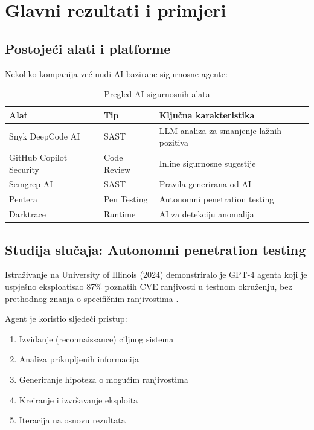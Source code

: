 \documentclass[12pt,a4paper]{article}
\begin{document}
\section{Glavni rezultati i primjeri}

\subsection{Postojeći alati i platforme}

Nekoliko kompanija već nudi AI-bazirane sigurnosne agente:

\begin{table}[H]
\centering
\begin{tabular}{lll}
\toprule
\textbf{Alat} & \textbf{Tip} & \textbf{Ključna karakteristika} \\
\midrule
Snyk DeepCode AI & SAST & LLM analiza za smanjenje lažnih pozitiva \\
GitHub Copilot Security & Code Review & Inline sigurnosne sugestije \\
Semgrep AI & SAST & Pravila generirana od AI \\
Pentera & Pen Testing & Autonomni penetration testing \\
Darktrace & Runtime & AI za detekciju anomalija \\
\bottomrule
\end{tabular}
\caption{Pregled AI sigurnosnih alata}
\end{table}

\subsection{Studija slučaja: Autonomni penetration testing}

Istraživanje na University of Illinois (2024) demonstriralo je GPT-4 agenta koji je uspješno eksploatisao 87\% poznatih CVE ranjivosti u testnom okruženju, bez prethodnog znanja o specifičnim ranjivostima \cite{fang2024}.

Agent je koristio sljedeći pristup:
\begin{enumerate}
    \item Izviđanje (reconnaissance) ciljnog sistema
    \item Analiza prikupljenih informacija
    \item Generiranje hipoteza o mogućim ranjivostima
    \item Kreiranje i izvršavanje eksploita
    \item Iteracija na osnovu rezultata
\end{enumerate}
\end{document}

